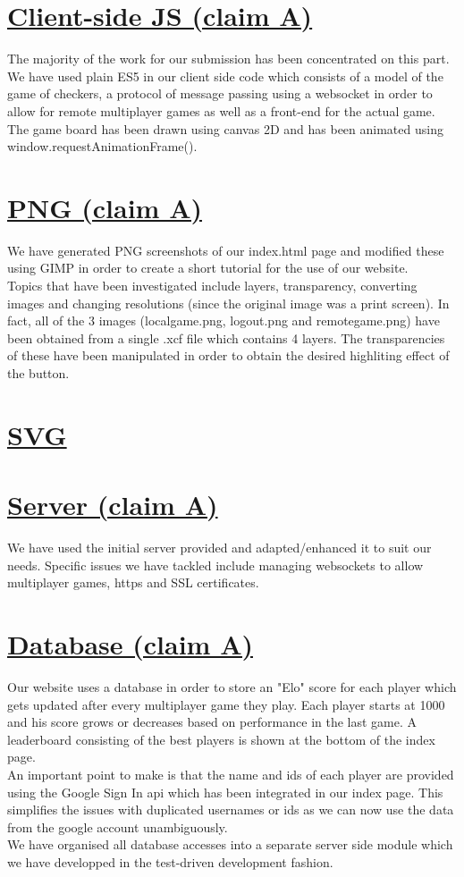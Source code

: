 \documentclass{article}
\begin{document}
\section{\underline{Client-side JS (claim A)}}\label{sec:clientJS}
    The majority of the work for our submission has been concentrated on this part. We have used plain ES5 in our client side code which consists of a model of the game of checkers,
    a protocol of message passing using a websocket in order to allow for remote multiplayer games as well as a front-end for the actual game.\\
    \indent The game board has been drawn using canvas 2D and has been animated using window.requestAnimationFrame().
\section{\underline{PNG (claim A)}}\label{sec:PNG}
    We have generated PNG screenshots of our index.html page and modified these using GIMP in order to create a short tutorial for the use of our website.\\
    Topics that have been investigated include layers, transparency, converting images and changing resolutions (since the original image was a print screen).
    In fact, all of the 3 images (localgame.png, logout.png and remotegame.png) have been obtained from a single .xcf file which contains 4 layers. The transparencies of these
    have been manipulated in order to obtain the desired highliting effect of the button.
\section{\underline{SVG}}\label{sec:SVG}
\section{\underline{Server (claim A)}}\label{sec:Server}
    We have used the initial server provided and adapted/enhanced it to suit our needs. 
    Specific issues we have tackled include managing websockets to allow multiplayer games, https and SSL certificates.
\section{\underline{Database (claim A)}}\label{sec:Database}
    Our website uses a database in order to store an "Elo" score for each player which gets updated after every multiplayer
    game they play. Each player starts at 1000 and his score grows or decreases based on performance in the last game. A leaderboard
    consisting of the best players is shown at the bottom of the index page.\\
    \indent An important point to make is that the name and ids of each player are provided using the Google Sign In api which has been  integrated in our 
    index page. This simplifies the issues with duplicated usernames or ids as we can now use the data from the google account unambiguously. \\
    \indent We have organised all database accesses into a separate server side module which we have developped in the test-driven
    development fashion.\\
\end{document}
